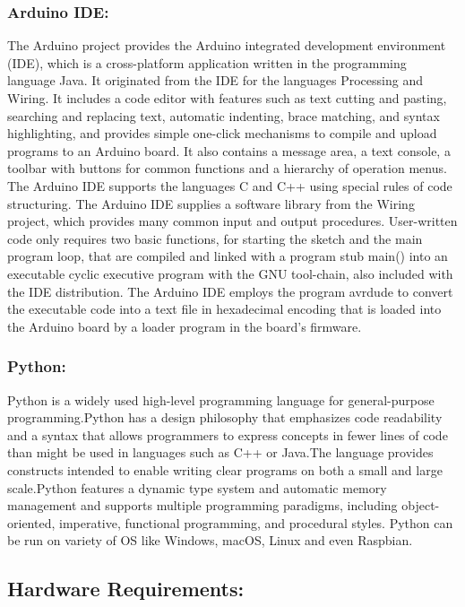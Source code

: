\documentclass[12pt]{article}
\begin{document}
\subsubsection{Arduino IDE:}
{\quad}The Arduino project provides the Arduino integrated development environment (IDE), which is a cross-platform application written in the programming language Java. It originated from the IDE for the languages Processing and Wiring. It includes a code editor with features such as text cutting and pasting, searching and replacing text, automatic indenting, brace matching, and syntax highlighting, and provides simple one-click mechanisms to compile and upload programs to an Arduino board. It also contains a message area, a text console, a toolbar with buttons for common functions and a hierarchy of operation menus.\\

{\quad}The Arduino IDE supports the languages C and C++ using special rules of code structuring. The Arduino IDE supplies a software library from the Wiring project, which provides many common input and output procedures. User-written code only requires two basic functions, for starting the sketch and the main program loop, that are compiled and linked with a program stub main() into an executable cyclic executive program with the GNU tool-chain, also included with the IDE distribution. The Arduino IDE employs the program avrdude to convert the executable code into a text file in hexadecimal encoding that is loaded into the Arduino board by a loader program in the board's firmware.

\subsubsection{Python:}
{\quad}Python is a widely used high-level programming language for general-purpose programming.Python has a design philosophy that emphasizes code readability and a syntax that allows programmers to express concepts in fewer lines of code than might be used in languages such as C++ or Java.The language provides constructs intended to enable writing clear programs on both a small and large scale.Python features a dynamic type system and automatic memory management and supports multiple programming paradigms, including object-oriented, imperative, functional programming, and procedural styles. Python can be run on variety of OS like Windows, macOS, Linux and even Raspbian.


\subsection{Hardware Requirements:}
\end{document}
